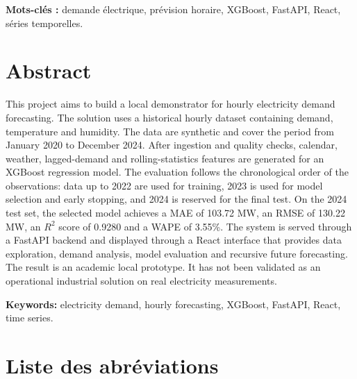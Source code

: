 \documentclass[12pt,a4paper]{report}
\begin{document}
\textbf{Mots-clés :} demande électrique, prévision horaire, XGBoost, FastAPI,
React, séries temporelles.

\chapter*{Abstract}

This project aims to build a local demonstrator for hourly electricity demand
forecasting. The solution uses a historical hourly dataset containing demand,
temperature and humidity. The data are synthetic and cover the period from
January 2020 to December 2024. After ingestion and quality checks, calendar,
weather, lagged-demand and rolling-statistics features are generated for an
XGBoost regression model. The evaluation follows the chronological order of
the observations: data up to 2022 are used for training, 2023 is used for
model selection and early stopping, and 2024 is reserved for the final test.
On the 2024 test set, the selected model achieves a MAE of 103.72 MW, an RMSE
of 130.22 MW, an $R^2$ score of 0.9280 and a WAPE of 3.55\%. The system is
served through a FastAPI backend and displayed through a React interface that
provides data exploration, demand analysis, model evaluation and recursive
future forecasting. The result is an academic local prototype. It has not
been validated as an operational industrial solution on real electricity
measurements.

\textbf{Keywords:} electricity demand, hourly forecasting, XGBoost, FastAPI,
React, time series.


\tableofcontents
{}

\listoffigures
{}

\listoftables
{}

\chapter*{Liste des abréviations}
\end{document}
